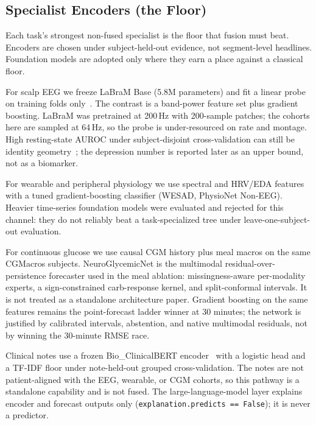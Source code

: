 \subsection{Specialist Encoders (the Floor)}
\label{subsec:encoders}

Each task's strongest non-fused specialist is the floor that fusion must beat. Encoders are
chosen under subject-held-out evidence, not segment-level headlines. Foundation models are
adopted only where they earn a place against a classical floor.

For scalp EEG we freeze LaBraM Base (5.8M parameters) and fit a linear probe on training folds
only~\cite{labram}. The contrast is a band-power feature set plus gradient boosting. LaBraM was
pretrained at 200\,Hz with 200-sample patches; the cohorts here are sampled at 64\,Hz, so the
probe is under-resourced on rate and montage. High resting-state AUROC under subject-disjoint
cross-validation can still be identity geometry~\cite{lin2026identity}; the depression number is
reported later as an upper bound, not as a biomarker.

For wearable and peripheral physiology we use spectral and HRV/EDA features with a tuned
gradient-boosting classifier (WESAD, PhysioNet Non-EEG). Heavier time-series foundation models
were evaluated and rejected for this channel: they do not reliably beat a task-specialized tree
under leave-one-subject-out evaluation.

For continuous glucose we use causal CGM history plus meal macros on the same CGMacros subjects.
NeuroGlycemicNet is the multimodal residual-over-persistence forecaster used in the meal
ablation: missingness-aware per-modality experts, a sign-constrained carb-response kernel, and
split-conformal intervals. It is not treated as a standalone architecture paper. Gradient boosting
on the same features remains the point-forecast ladder winner at 30 minutes; the network is
justified by calibrated intervals, abstention, and native multimodal residuals, not by winning
the 30-minute RMSE race.

Clinical notes use a frozen Bio\_ClinicalBERT encoder~\cite{clinicalbert} with a logistic head and
a TF-IDF floor under note-held-out grouped cross-validation. The notes are not patient-aligned
with the EEG, wearable, or CGM cohorts, so this pathway is a standalone capability and is not
fused. The large-language-model layer explains encoder and forecast outputs only
(\texttt{explanation.predicts == False}); it is never a predictor.
